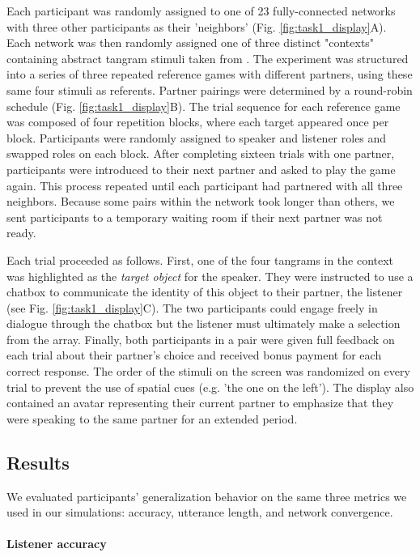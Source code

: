 Each participant was randomly assigned to one of 23 fully-connected networks with three other participants as their 'neighbors' (Fig. \ref{fig:task1_display}A). 
Each network was then randomly assigned one of three distinct "contexts" containing abstract tangram stimuli taken from \cite{ClarkWilkesGibbs86_ReferringCollaborative}.
The experiment was structured into a series of three repeated reference games with different partners, using these same four stimuli as referents.
Partner pairings were determined by a round-robin schedule (Fig. \ref{fig:task1_display}B).
The trial sequence for each reference game was composed of four repetition blocks, where each target appeared once per block.
Participants were randomly assigned to speaker and listener roles and swapped roles on each block.
After completing sixteen trials with one partner, participants were introduced to their next partner and asked to play the game again. 
This process repeated until each participant had partnered with all three neighbors.
Because some pairs within the network took longer than others, we sent participants to a temporary waiting room if their next partner was not ready. 

Each trial proceeded as follows.
First, one of the four tangrams in the context was highlighted as the \emph{target object} for the speaker.
They were instructed to use a chatbox to communicate the identity of this object to their partner, the listener (see Fig. \ref{fig:task1_display}C).
The two participants could engage freely in dialogue through the chatbox but the listener must ultimately make a selection from the array. 
Finally, both participants in a pair were given full feedback on each trial about their partner's choice and received bonus payment for each correct response. 
The order of the stimuli on the screen was randomized on every trial to prevent the use of spatial cues (e.g. 'the one on the left').
The display also contained an avatar representing their current partner to emphasize that they were speaking to the same partner for an extended period.

\subsection{Results}


We evaluated participants' generalization behavior on the same three metrics we used in our simulations: accuracy, utterance length, and network convergence.

\paragraph{Listener accuracy}

